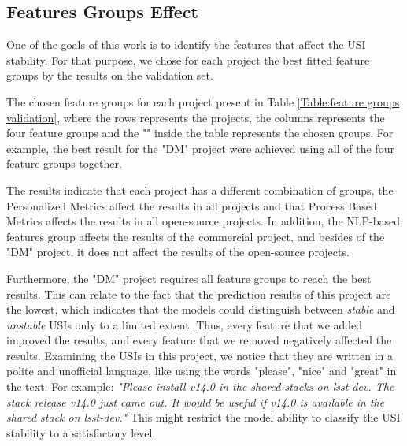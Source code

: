 \subsection{Features Groups Effect}
\label{features_groups_influence_subsection}
One of the goals of this work is to identify the features that affect the USI stability. For that purpose, we chose for each project the best fitted feature groups by the results on %
the validation set. 

The chosen feature groups for each project present in Table \ref{Table:feature groups validation}, where the rows represents the projects, the columns represents the four feature groups and the "\checkmark" inside the table represents the chosen groups. For example, the best result for the "DM" project  were achieved using all of the four feature groups together.

The results indicate that each project has a different combination of groups, the Personalized Metrics affect the results in all projects and that Process Based Metrics affects the results in all open-source projects. 
In addition, the NLP-based features group affects the results of the commercial project, and besides of the "DM" project, it does not affect the results of the open-source projects. 

Furthermore, the "DM" project requires all feature groups to reach the best results. This can relate to the fact that the prediction results of this project are the lowest, which indicates that the models could distinguish between \emph{stable} and \emph{unstable} USIs only to a limited extent. Thus, every feature that we added improved the results, and every feature that we removed negatively affected the results. Examining the USIs in this project, we notice that they are written in a polite and %
unofficial language, like using the words "please", "nice" and "great" in the text. For example: \emph{"Please install v14.0 in the shared stacks on lsst-dev. The stack release v14.0 just came out. It would be useful if v14.0 is available in the shared stack on lsst-dev."}
This might restrict the model ability to classify the USI stability to a satisfactory level.

